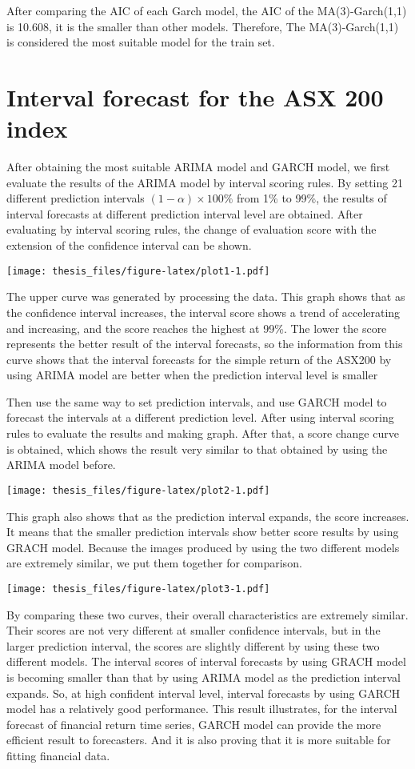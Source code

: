 \documentclass{monashthesis}
\theoremstyle{definition}
\theoremstyle{definition}
\theoremstyle{definition}
\theoremstyle{remark}
\begin{document}
After comparing the AIC of each Garch model, the AIC of the
MA(3)-Garch(1,1) is 10.608, it is the smaller than other models.
Therefore, The MA(3)-Garch(1,1) is considered the most suitable model
for the train set.

\section{Interval forecast for the ASX 200
index}\label{interval-forecast-for-the-asx-200-index}

After obtaining the most suitable ARIMA model and GARCH model, we first
evaluate the results of the ARIMA model by interval scoring rules. By
setting 21 different prediction intervals \((1-\alpha)\times100\%\) from
1\% to 99\%, the results of interval forecasts at different prediction
interval level are obtained. After evaluating by interval scoring rules,
the change of evaluation score with the extension of the confidence
interval can be shown.

\texttt{[image: thesis\_files/figure-latex/plot1-1.pdf]}

The upper curve was generated by processing the data. This graph shows
that as the confidence interval increases, the interval score shows a
trend of accelerating and increasing, and the score reaches the highest
at 99\%. The lower the score represents the better result of the
interval forecasts, so the information from this curve shows that the
interval forecasts for the simple return of the ASX200 by using ARIMA
model are better when the prediction interval level is smaller

Then use the same way to set prediction intervals, and use GARCH model
to forecast the intervals at a different prediction level. After using
interval scoring rules to evaluate the results and making graph. After
that, a score change curve is obtained, which shows the result very
similar to that obtained by using the ARIMA model before.

\texttt{[image: thesis\_files/figure-latex/plot2-1.pdf]}

This graph also shows that as the prediction interval expands, the score
increases. It means that the smaller prediction intervals show better
score results by using GRACH model. Because the images produced by using
the two different models are extremely similar, we put them together for
comparison.

\texttt{[image: thesis\_files/figure-latex/plot3-1.pdf]}

By comparing these two curves, their overall characteristics are
extremely similar. Their scores are not very different at smaller
confidence intervals, but in the larger prediction interval, the scores
are slightly different by using these two different models. The interval
scores of interval forecasts by using GRACH model is becoming smaller
than that by using ARIMA model as the prediction interval expands. So,
at high confident interval level, interval forecasts by using GARCH
model has a relatively good performance. This result illustrates, for
the interval forecast of financial return time series, GARCH model can
provide the more efficient result to forecasters. And it is also proving
that it is more suitable for fitting financial data.
\end{document}
